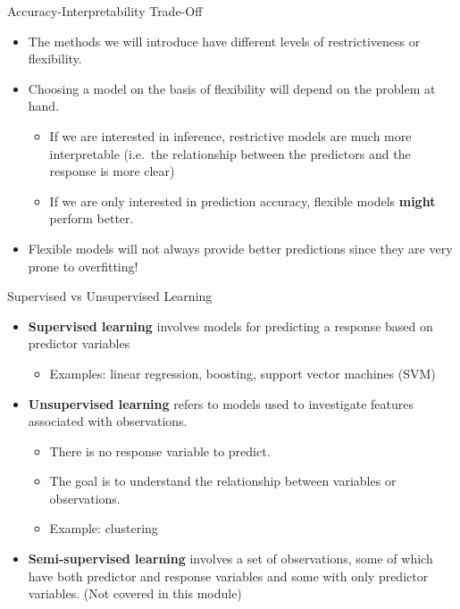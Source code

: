 \documentclass[
  ignorenonframetext,
  aspectratio=169,
]{beamer}
\providecommand{\tightlist}{%
  \setlength{\itemsep}{0pt}\setlength{\parskip}{0pt}}\usepackage{longtable,booktabs,array}
\begin{document}
\begin{frame}{Accuracy-Interpretability Trade-Off}
\protect\hypertarget{accuracy-interpretability-trade-off}{}
\begin{itemize}
\tightlist
\item
  The methods we will introduce have different levels of restrictiveness
  or flexibility.
\item
  Choosing a model on the basis of flexibility will depend on the
  problem at hand.

  \begin{itemize}
  \tightlist
  \item
    \alert{If we are interested in inference, restrictive models are much more interpretable}
    (i.e.~the relationship between the predictors and the response is
    more clear)
  \item
    \alert{If we are only interested in prediction accuracy, flexible models \textbf{might} perform better.}
  \end{itemize}
\item
  Flexible models will not always provide better predictions since they
  are very prone to overfitting!
\end{itemize}
\end{frame}

\begin{frame}{Supervised vs Unsupervised Learning}
\protect\hypertarget{supervised-vs-unsupervised-learning}{}
\begin{itemize}
\tightlist
\item
  \textbf{Supervised learning} involves models for predicting a response
  based on predictor variables

  \begin{itemize}
  \tightlist
  \item
    Examples: linear regression, boosting, support vector machines (SVM)
  \end{itemize}
\item
  \textbf{Unsupervised learning} refers to models used to investigate
  features associated with observations.

  \begin{itemize}
  \tightlist
  \item
    There is no response variable to predict.
  \item
    The goal is to understand the relationship between variables or
    observations.
  \item
    Example: clustering
  \end{itemize}
\item
  \textbf{Semi-supervised learning} involves a set of observations, some
  of which have both predictor and response variables and some with only
  predictor variables. (Not covered in this module)
\end{itemize}
\end{frame}
\end{document}
